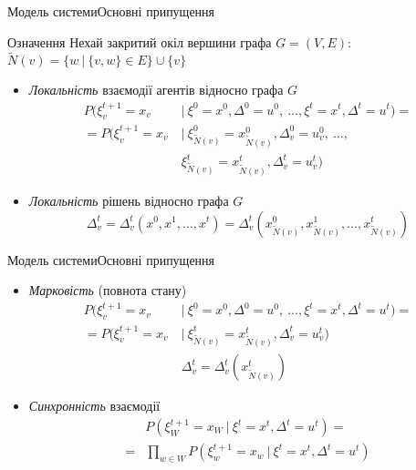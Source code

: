 \documentclass[pdf]{beamer}
\begin{document}
\begin{frame}{Модель системи}{Основні припущення}
\begin{block}{Означення}
Нехай закритий окіл вершини графа \(G = (V, E)\): \(\tilde{N}(v) = \big\{w\ |\ \{v, w\} \in E\big\} \cup \{v\}\:\)
\end{block}

	\begin{itemize}
	\item<2-> \textit{Локальність} взаємодії агентів відносно графа \(G\)
    \begin{align*}
    P(\xi_v^{t+1} = x_v\ &|\ \xi^0 = x^0, \Delta^0 = u^0,\ \ldots, \xi^t = x^t, \Delta^t = u^t) = \\
	= P(\xi_v^{t+1} = x_v\ &|\ \xi_{\tilde N(v)}^0 = x_{\tilde N(v)}^0, \Delta_v^0 = u_v^0,\ \ldots,\\ &\xi_{\tilde N(v)}^t = x_{\tilde N(v)}^t, \Delta_v^t = u_v^t)
	\end{align*}
	\item<3-> \textit{Локальність} рішень відносно графа \(G\)
	\[\Delta_v^{t} = \Delta_v^{t}(x^0, x^1, \ldots, x^t) = \Delta_v^{t}(x_{\tilde{N}(v)}^0, x_{\tilde{N}(v)}^1, \ldots, x_{\tilde{N}(v)}^t)\]
	\end{itemize}

\end{frame}


\begin{frame}{Модель системи}{Основні припущення}
\begin{itemize}[<+->]
	\item \textit{Марковість} (повнота стану)
    \begin{align*}
    P(\xi_v^{t+1} = x_v\ &|\ \xi^0 = x^0, \Delta^0 = u^0,\ \ldots, \xi^t = x^t, \Delta^t = u^t) = \\
	= P(\xi_v^{t+1} = x_v\ &|\ \xi_{\tilde N(v)}^t = x_{\tilde N(v)}^t, \Delta_v^t = u_v^t) \\
	&\Delta_v^{t} = \Delta_v^{t}(x_{\tilde{N}(v)}^t)
	\end{align*}
	\item \textit{Синхронність} взаємодії
	\begin{align*}
	&P(\xi^{t+1}_W = x_W\ |\ \xi^t = x^t, \Delta^t = u^t) = \\
    = &\prod_{w \in W} P(\xi^{t+1}_w = x_w\ |\ \xi^t = x^t, \Delta^t = u^t)
    \end{align*}
	\end{itemize}
\end{frame}
\end{document}
